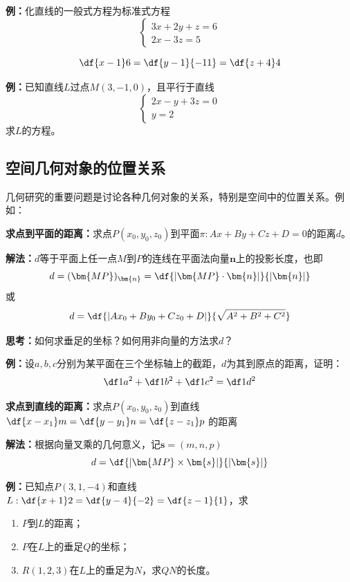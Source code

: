 {\bf 例：}化直线的一般式方程为标准式方程
$$\left\{\begin{array}{l}
	3x+2y+z=6\\
	2x-3z=5
\end{array}\right.$$

$$\df{x-1}6=\df{y-1}{-11}=\df{z+4}4$$

{\bf 例：}已知直线$L$过点$M(3,-1,0)$，且平行于直线
$$\left\{\begin{array}{l}
	2x-y+3z=0\\
	y=2
\end{array}\right.$$
求$L$的方程。

\subsection{空间几何对象的位置关系}

几何研究的重要问题是讨论各种几何对象的关系，特别是空间中的位置关系。例如：

\begin{thx}
	{\bf 求点到平面的距离：}求点$P(x_0,y_0,z_0)$到平面$\pi:Ax+By+Cz+D=0$的距离$d$。

	{\bf 解法：}$d$等于平面上任一点$M$到$P$的连线在平面法向量$\bm{n}$上的投影长度，也即 
	$$d=(\bm{MP})_{\bm{n}}=\df{|\bm{MP}\cdot\bm{n}|}{|\bm{n}|}$$ 
	或
	$${d=\df{|Ax_0+By_0+Cz_0+D|}{\sqrt{A^2+B^2+C^2}}}$$
\end{thx}

{\bf 思考：}如何求垂足的坐标？如何用非向量的方法求$d$？

{\bf 例：}设$a,b,c$分别为某平面在三个坐标轴上的截距，$d$为其到原点的距离，证明：
$$\df1{a^2}+\df1{b^2}+\df1{c^2}=\df1{d^2}$$

\begin{thx}
	{\bf 求点到直线的距离：}求点$P(x_0,y_0,z_0)$到直线$\df{x-x_1}m=\df{y-y_1}n=\df{z-z_1}p$
	的距离
	
	{\bf 解法：}根据向量叉乘的几何意义，记$\bm{s}=(m,n,p)$
	$$d=\df{|\bm{MP}\times\bm{s}|}{|\bm{s}|}$$
\end{thx}

{\bf 例：}已知点$P(3,1,-4)$和直线$L:\df{x+1}2=\df{y-4}{-2}=\df{z-1}{1}$，求
\begin{enumerate}[(1)]
  \setlength{\itemindent}{1cm}
  \item $P$到$L$的距离；
  \item $P$在$L$上的垂足$Q$的坐标；
  \item $R(1,2,3)$在$L$上的垂足为$N$，求$QN$的长度。
\end{enumerate}

